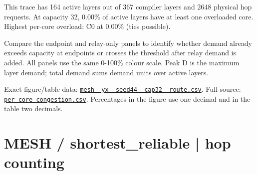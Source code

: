 \documentclass[10pt,a4paper]{article}
\begin{document}
This trace has 164 active layers out of 367 compiler layers and 2648 physical hop requests. At capacity 32, 0.00\% of active layers have at least one overloaded core. Highest per-core overload: C0 at 0.00\% (ties possible).\par
Compare the endpoint and relay-only panels to identify whether demand already exceeds capacity at endpoints or crosses the threshold after relay demand is added. All panels use the same 0-100\% colour scale. Peak D is the maximum layer demand; total demand sums demand units over active layers.\par
Exact figure/table data: \href{\detokenize{file:///home/dhruv-pansuriya/Documents/BTP/Compiler-Driven-ACE/output/pdf/qaoa_methods_congestion/tables/mesh__yx__seed44__cap32__route.csv}}{\nolinkurl{mesh__yx__seed44__cap32__route.csv}}. Full source: \href{\detokenize{file:///home/dhruv-pansuriya/Documents/BTP/Compiler-Driven-ACE/results/qaoa_2seed_2026-10-26/congestion/per_core_congestion.csv}}{\nolinkurl{per_core_congestion.csv}}. Percentages in the figure use one decimal and in the table two decimals.\par
\clearpage
\section*{MESH / shortest\_reliable | hop counting}
\end{document}
